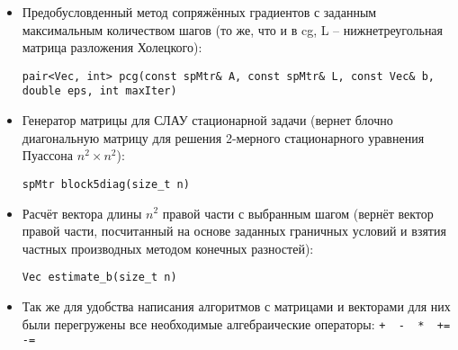 \begin{itemize}
\item Предобусловденный метод сопряжённых градиентов с заданным максимальным количеством шагов (то же, что и в cg, L -- нижнетреугольная матрица разложения Холецкого):

\lstinline|pair<Vec, int> pcg(const spMtr& A, const spMtr& L, const Vec& b, double eps, int maxIter)|\\

\item Генератор матрицы для СЛАУ стационарной задачи (вернет блочно диагональную матрицу для решения 2-мерного стационарного уравнения Пуассона $n^2\times n^2$):

\lstinline|spMtr block5diag(size_t n)|\\

\item Расчёт вектора длины $n^2$ правой части с выбранным шагом (вернёт вектор правой части, посчитанный на основе заданных граничных условий и взятия частных производных методом конечных разностей):

\lstinline|Vec estimate_b(size_t n)|

\item Так же для удобства написания алгоритмов с матрицами и векторами для них были перегружены все необходимые алгебраические операторы: \lstinline|+  -  *  +=  -=|
\end{itemize}

